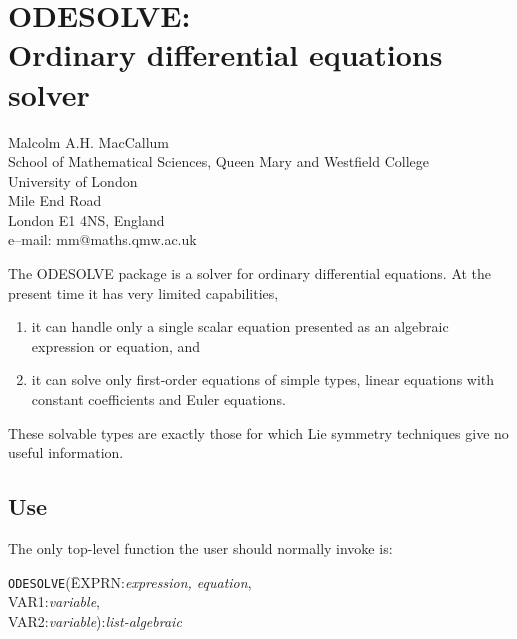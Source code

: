 \chapter[ODESOLVE: Ordinary differential eqns]%
        {ODESOLVE: \protect\\ Ordinary differential equations solver}
\label{ODESOLVE}

{\footnotesize
\begin{center}
Malcolm A.H. MacCallum \\
School of Mathematical Sciences, Queen Mary and Westfield College \\
University of London \\
Mile End Road \\
London E1 4NS, England \\[0.05in]
e--mail: mm@maths.qmw.ac.uk
\end{center}
}

The ODESOLVE package is a solver for ordinary differential equations.
At the present time it has very limited capabilities,

\begin{enumerate}
\item it can handle only a single scalar equation presented as an
algebraic expression or equation, and
\item it can solve only first-order equations of simple types,
linear equations with constant coefficients and Euler equations.
\end{enumerate}

\noindent These solvable types are exactly those for
which Lie symmetry techniques give no useful information.

\section{Use}
The only top-level function the user should normally invoke is:

\vspace{.1in}
\begin{tabbing}
{\tt ODESOLVE}(\=EXPRN:{\em expression, equation}, \\
\>VAR1:{\em variable}, \\
\>VAR2:{\em variable}):{\em list-algebraic}
\end{tabbing}
\vspace{.1in}

